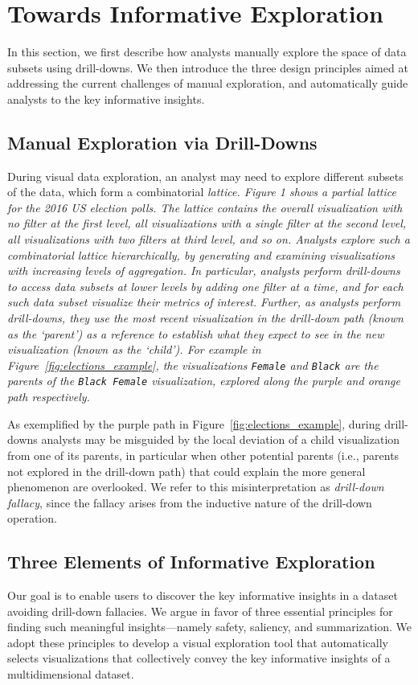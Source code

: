
\section{Towards Informative Exploration}
In this section, we first describe how analysts manually explore the space of data subsets using drill-downs. We then introduce the three design principles aimed at addressing the current challenges of manual exploration, and automatically guide analysts to the key informative insights. 

\subsection{Manual Exploration via Drill-Downs}
During visual data exploration, an analyst may need to explore different subsets of the data, which form a combinatorial \em{lattice}. Figure 1 shows a partial lattice for the 2016 US election polls. The lattice contains the overall visualization with no filter at the first level, all visualizations with a single filter at the second level, all visualizations with two filters at third level, and so on. Analysts explore such a combinatorial lattice hierarchically, by generating and examining visualizations with increasing levels of aggregation. In particular, analysts perform drill-downs to access data subsets at lower levels by adding one filter at a time, and for each such data subset visualize their metrics of interest. Further, as analysts perform drill-downs, they use the most recent visualization in the drill-down path (known as the `parent') as a reference to establish what they expect to see in the new visualization (known as the `child'). For example in Figure~\ref{fig:elections_example}, the visualizations \texttt{Female} and \texttt{Black} are the \em{parents} of the \texttt{Black Female} visualization, explored along the purple and orange path respectively.
\par As exemplified by the purple path in Figure~\ref{fig:elections_example}, during drill-downs analysts may be misguided by the local deviation of a child visualization from one of its parents, in particular when other potential parents (i.e., parents not explored in the drill-down path) that could explain the more general phenomenon are overlooked. We refer to this misinterpretation as \emph{drill-down fallacy}, since the fallacy arises from the inductive nature of the drill-down operation. 

\subsection{Three Elements of Informative Exploration}
Our goal is to enable users to discover the key informative insights in a dataset avoiding drill-down fallacies. We argue in favor of three essential principles for finding such meaningful insights---namely safety, saliency, and summarization. We adopt these principles to develop a visual exploration tool that automatically selects visualizations that collectively convey the key informative insights of a multidimensional dataset.


